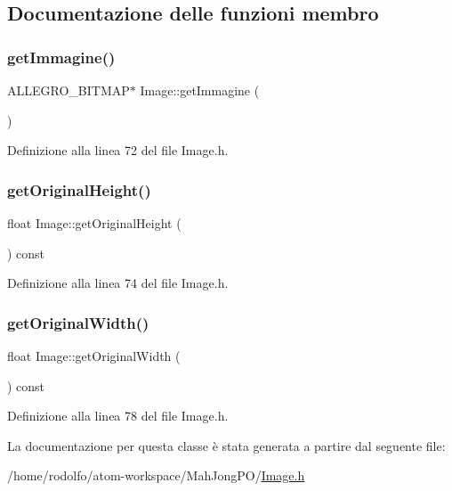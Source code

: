 \subsection{Documentazione delle funzioni membro}
\mbox{\label{class_image_a07f53736dd232f43440086afdd65819b}} 
\subsubsection{\texorpdfstring{get\+Immagine()}{getImmagine()}}
{\footnotesize\ttfamily A\+L\+L\+E\+G\+R\+O\+\_\+\+B\+I\+T\+M\+AP$\ast$ Image\+::get\+Immagine (\begin{DoxyParamCaption}{ }\end{DoxyParamCaption})\hspace{0.3cm}{\ttfamily [inline]}}



Definizione alla linea 72 del file Image.\+h.

\mbox{\label{class_image_afff3dfe926bcd0577a306a77b6cfe2a7}} 
\subsubsection{\texorpdfstring{get\+Original\+Height()}{getOriginalHeight()}}
{\footnotesize\ttfamily float Image\+::get\+Original\+Height (\begin{DoxyParamCaption}{ }\end{DoxyParamCaption}) const\hspace{0.3cm}{\ttfamily [inline]}}



Definizione alla linea 74 del file Image.\+h.

\mbox{\label{class_image_a89a84a3ca7f9f116b2e48f78d1f05122}} 
\subsubsection{\texorpdfstring{get\+Original\+Width()}{getOriginalWidth()}}
{\footnotesize\ttfamily float Image\+::get\+Original\+Width (\begin{DoxyParamCaption}{ }\end{DoxyParamCaption}) const\hspace{0.3cm}{\ttfamily [inline]}}



Definizione alla linea 78 del file Image.\+h.



La documentazione per questa classe è stata generata a partire dal seguente file\+:\begin{DoxyCompactItemize}
\item 
/home/rodolfo/atom-\/workspace/\+Mah\+Jong\+P\+O/\hyperlink{_image_8h}{Image.\+h}\end{DoxyCompactItemize}
